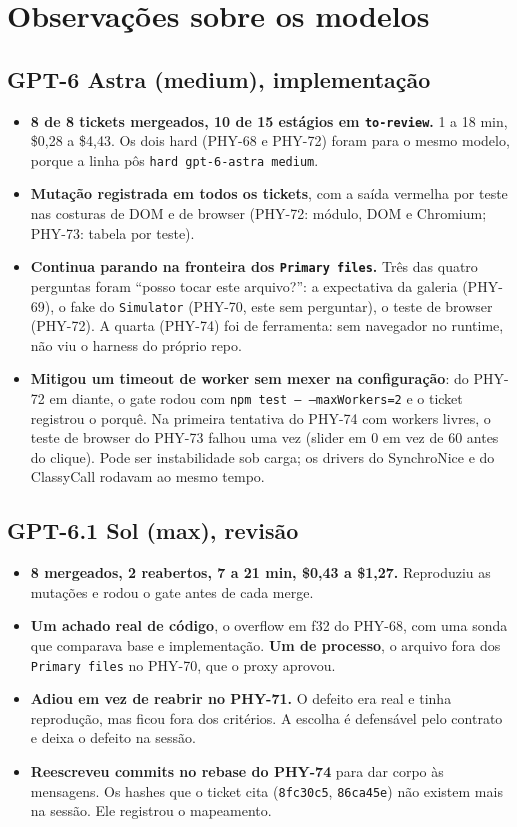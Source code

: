 \documentclass[11pt,a4paper]{article}
\begin{document}
\section{Observações sobre os modelos}

\subsection*{GPT-6 Astra (medium), implementação}
\begin{itemize}
  \item \textbf{8 de 8 tickets mergeados, 10 de 15 estágios em
        \texttt{to-review}.} 1 a 18 min, \$0,28 a \$4,43. Os dois hard
        (PHY-68 e PHY-72) foram para o mesmo modelo, porque a linha pôs
        \texttt{hard gpt-6-astra medium}.
  \item \textbf{Mutação registrada em todos os tickets}, com a saída vermelha
        por teste nas costuras de DOM e de browser (PHY-72: módulo, DOM e
        Chromium; PHY-73: tabela por teste).
  \item \textbf{Continua parando na fronteira dos \texttt{Primary files}.} Três
        das quatro perguntas foram ``posso tocar este arquivo?'': a expectativa
        da galeria (PHY-69), o fake do \texttt{Simulator} (PHY-70, este sem
        perguntar), o teste de browser (PHY-72). A quarta (PHY-74) foi de
        ferramenta: sem navegador no runtime, não viu o harness do próprio
        repo.
  \item \textbf{Mitigou um timeout de worker sem mexer na configuração}: do
        PHY-72 em diante, o gate rodou com \texttt{npm test -- --maxWorkers=2}
        e o ticket registrou o porquê. Na primeira tentativa do PHY-74 com
        workers livres, o teste de browser do PHY-73 falhou uma vez (slider em
        0 em vez de 60 antes do clique). Pode ser instabilidade sob carga; os
        drivers do SynchroNice e do ClassyCall rodavam ao mesmo tempo.
\end{itemize}

\subsection*{GPT-6.1 Sol (max), revisão}
\begin{itemize}
  \item \textbf{8 mergeados, 2 reabertos, 7 a 21 min, \$0,43 a \$1,27.}
        Reproduziu as mutações e rodou o gate antes de cada merge.
  \item \textbf{Um achado real de código}, o overflow em f32 do PHY-68, com uma
        sonda que comparava base e implementação. \textbf{Um de processo}, o
        arquivo fora dos \texttt{Primary files} no PHY-70, que o proxy aprovou.
  \item \textbf{Adiou em vez de reabrir no PHY-71.} O defeito era real e tinha
        reprodução, mas ficou fora dos critérios. A escolha é defensável pelo
        contrato e deixa o defeito na sessão.
  \item \textbf{Reescreveu commits no rebase do PHY-74} para dar corpo às
        mensagens. Os hashes que o ticket cita (\texttt{8fc30c5},
        \texttt{86ca45e}) não existem mais na sessão. Ele registrou o
        mapeamento.
\end{itemize}
\end{document}
